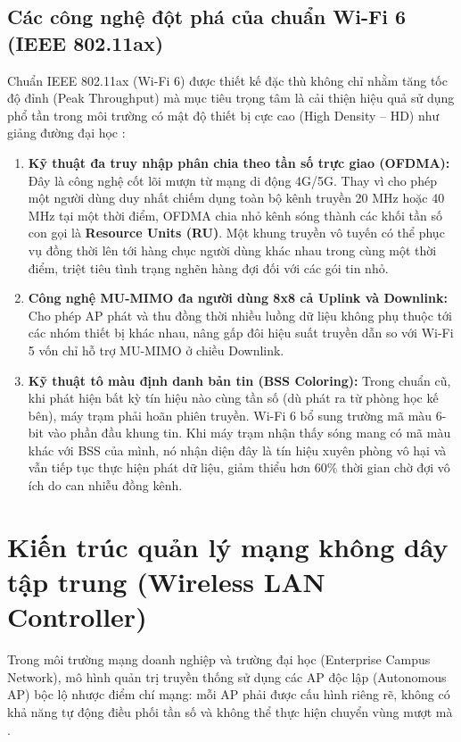 \subsection{Các công nghệ đột phá của chuẩn Wi-Fi 6 (IEEE 802.11ax)}

Chuẩn IEEE 802.11ax (Wi-Fi 6) \cite{ieee80211ax_2021} được thiết kế đặc thù không chỉ nhằm tăng tốc độ đỉnh (Peak Throughput) mà mục tiêu trọng tâm là cải thiện hiệu quả sử dụng phổ tần trong môi trường có mật độ thiết bị cực cao (High Density -- HD) như giảng đường đại học \cite{khorov2019tutorial}:

\begin{enumerate}
    \item \textbf{Kỹ thuật đa truy nhập phân chia theo tần số trực giao (OFDMA):} Đây là công nghệ cốt lõi mượn từ mạng di động 4G/5G. Thay vì cho phép một người dùng duy nhất chiếm dụng toàn bộ kênh truyền 20 MHz hoặc 40 MHz tại một thời điểm, OFDMA chia nhỏ kênh sóng thành các khối tần số con gọi là \textbf{Resource Units (RU)}. Một khung truyền vô tuyến có thể phục vụ đồng thời lên tới hàng chục người dùng khác nhau trong cùng một thời điểm, triệt tiêu tình trạng nghẽn hàng đợi đối với các gói tin nhỏ.
    \item \textbf{Công nghệ MU-MIMO đa người dùng 8x8 cả Uplink và Downlink:} Cho phép AP phát và thu đồng thời nhiều luồng dữ liệu không phụ thuộc tới các nhóm thiết bị khác nhau, nâng gấp đôi hiệu suất truyền dẫn so với Wi-Fi 5 vốn chỉ hỗ trợ MU-MIMO ở chiều Downlink.
    \item \textbf{Kỹ thuật tô màu định danh bản tin (BSS Coloring):} Trong chuẩn cũ, khi phát hiện bất kỳ tín hiệu nào cùng tần số (dù phát ra từ phòng học kế bên), máy trạm phải hoãn phiên truyền. Wi-Fi 6 bổ sung trường mã màu 6-bit vào phần đầu khung tin. Khi máy trạm nhận thấy sóng mang có mã màu khác với BSS của mình, nó nhận diện đây là tín hiệu xuyên phòng vô hại và vẫn tiếp tục thực hiện phát dữ liệu, giảm thiểu hơn 60\% thời gian chờ đợi vô ích do can nhiễu đồng kênh.
\end{enumerate}

\section{Kiến trúc quản lý mạng không dây tập trung (Wireless LAN Controller)}

Trong môi trường mạng doanh nghiệp và trường đại học (Enterprise Campus Network), mô hình quản trị truyền thống sử dụng các AP độc lập (Autonomous AP) bộc lộ nhược điểm chí mạng: mỗi AP phải được cấu hình riêng rẽ, không có khả năng tự động điều phối tần số và không thể thực hiện chuyển vùng mượt mà \cite{cisco2021wlan}.

